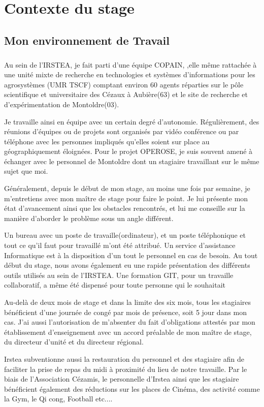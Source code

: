 \chapter{Contexte du stage}
\section{Mon environnement de Travail}
\paragraph{}
Au sein de l'IRSTEA, je fait parti d'une équipe COPAIN, ,elle même rattachée à une unité mixte de recherche en technologies et systèmes d'informations pour les agrosystèmes (UMR TSCF) comptant environ 60 agents  réparties sur le pôle scientifique et universitaire des Cézaux à Aubière(63) et le site de recherche et d'expérimentation de Montoldre(03).

Je travaille ainsi en équipe avec un certain degré d'autonomie. Régulièrement, des réunions d'équipes ou de projets sont organisés par vidéo conférence ou par téléphone avec les personnes impliqués qu'elles soient sur place au géographiquement éloignées. Pour le projet OPEROSE, je suis souvent amené à échanger avec le personnel de Montoldre dont un stagiaire travaillant sur le même sujet que moi.

Généralement, depuis le début de mon stage, au moins une fois par semaine, je m'entretiens avec mon maître de stage pour faire le point. Je lui présente mon état d'avancement ainsi que les obstacles rencontrés, et lui me conseille sur la manière d'aborder le problème sous un angle différent.

Un bureau avec un poste de travaille(ordinateur), et un poste téléphonique et tout ce qu'il faut pour travaillé m'ont été attribué. Un service d'assistance Informatique est à la disposition d'un tout le personnel en cas de besoin. Au tout début du stage, nous avons également eu une rapide présentation des différents outils utilisés au sein de l'IRSTEA. Une formation GIT, pour un travaille collaboratif, a même été dispensé pour toute personne qui le souhaitait 

Au-delà de deux mois de stage et dans la limite des six mois, tous les stagiaires bénéficient d'une journée de congé par mois de présence, soit 5 jour dans mon cas. J'ai aussi l'autorisation de m'absenter du fait d'obligations attestés par mon établissement d'enseignement avec un accord préalable de mon maître de stage, du directeur d'unité et du directeur régional.

Irstea subventionne aussi la restauration du personnel et des stagiaire afin de faciliter la prise de repas du midi à proximité du lieu de notre travaille. Par le biais de l'Association Cézamis, le personnelle d'Irstea ainsi que les stagiaire bénéficient également des réductions sur les places de Cinéma, des activité comme la Gym, le Qi cong, Football etc....